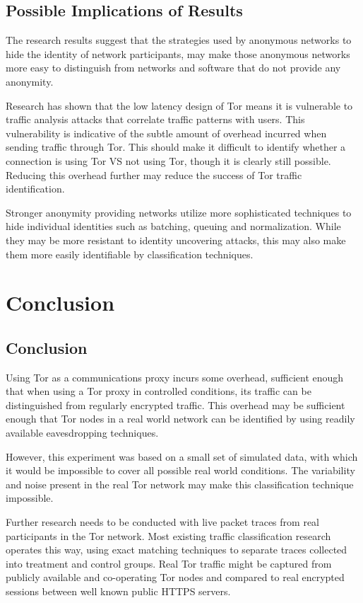 

\section{Possible Implications of Results}

The research results suggest that the strategies used by anonymous networks to
hide the identity of network participants, may make those anonymous networks
more easy to distinguish from networks and software that do not provide any
anonymity.

Research has shown that the low latency design of Tor means it is vulnerable to
traffic analysis attacks that correlate traffic patterns with users. This
vulnerability is indicative of the subtle amount of overhead incurred when
sending traffic through Tor. This should make it difficult to identify whether a
connection is using Tor VS not using Tor, though it is clearly still possible.
Reducing this overhead further may reduce the success of Tor traffic
identification.

Stronger anonymity providing networks utilize more sophisticated techniques to
hide individual identities such as batching, queuing and normalization. While
they may be more resistant to identity uncovering attacks, this may also make
them more easily identifiable by classification techniques.

\chapter{Conclusion}

\section{Conclusion}

Using Tor as a communications proxy incurs some overhead, sufficient enough
that when using a Tor proxy in controlled conditions, its traffic can be
distinguished from regularly encrypted traffic. This overhead may be sufficient
enough that Tor nodes in a real world network can be identified by using
readily available eavesdropping techniques.

However, this experiment was based on a small set of simulated data, with which
it would be impossible to cover all possible real world conditions. The
variability and noise present in the real Tor network may make this
classification technique impossible.

Further research needs to be conducted with live packet traces from real
participants in the Tor network. Most existing traffic classification research
operates this way, using exact matching techniques to separate traces collected
into treatment and control groups. Real Tor traffic might be captured from
publicly available and co-operating Tor nodes and compared to real encrypted
sessions between well known public HTTPS servers.
